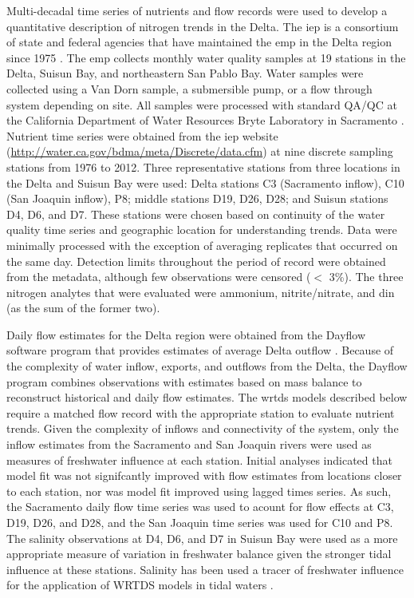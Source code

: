 \documentclass[letterpaper,12pt,oneside]{article}\usepackage[]{graphicx}\usepackage[]{color}
\begin{document}
Multi-decadal time series of nutrients and flow records were used to develop a quantitative description of nitrogen trends in the Delta.  The \ac{iep} is a consortium of state and federal agencies that have maintained the \ac{emp} in the Delta region since 1975 \citep{IEP13}.  The \ac{emp} collects monthly water quality samples at 19 stations in the Delta, Suisun Bay, and northeastern San Pablo Bay.  Water samples were collected using a Van Dorn sample, a submersible pump, or a flow through system depending on site.  All samples were processed with standard QA/QC at the California Department of Water Resources Bryte Laboratory in Sacramento \citep[references in][]{IEP13}.  Nutrient time series were obtained from the \ac{iep} website (\url{http://water.ca.gov/bdma/meta/Discrete/data.cfm}) at nine discrete sampling stations from 1976 to 2012.  Three representative stations from  three locations in the Delta and Suisun Bay were used: Delta stations C3 (Sacramento inflow), C10 (San Joaquin inflow), P8; middle stations D19, D26, D28; and Suisun stations D4, D6, and D7.  These stations were chosen based on continuity of the water quality time series and geographic location for understanding trends.  Data were minimally processed with the exception of averaging replicates that occurred on the same day.  Detection limits throughout the period of record were obtained from the metadata, although few observations were censored ($<$ 3\%).  The three nitrogen analytes that were evaluated were ammonium, nitrite/nitrate, and \ac{din} (as the sum of the former two).  

Daily flow estimates for the Delta region were obtained from the Dayflow software program that provides estimates of average Delta outflow \citep{IEP16}.  Because of the complexity of water inflow, exports, and outflows from the Delta, the Dayflow program combines observations with estimates based on mass balance to reconstruct historical and daily flow estimates.  The \ac{wrtds} models described below require a matched flow record with the appropriate station to evaluate nutrient trends. Given the complexity of inflows and connectivity of the system, only the inflow estimates from the Sacramento and San Joaquin rivers were used as measures of freshwater influence at each station.  Initial analyses indicated that model fit was not signifcantly improved with flow estimates from locations closer to each station, nor was model fit improved using lagged times series.  As such, the Sacramento daily flow time series was used to acount for flow effects at C3, D19, D26, and D28, and the San Joaquin time series was used for C10 and P8.  The salinity observations at D4, D6, and D7 in Suisun Bay were used as a more appropriate measure of variation in freshwater balance given the stronger tidal influence at these stations.  Salinity has been used a tracer of freshwater influence for the application of WRTDS models in tidal waters \citep{Beck15}.  
\end{document}
